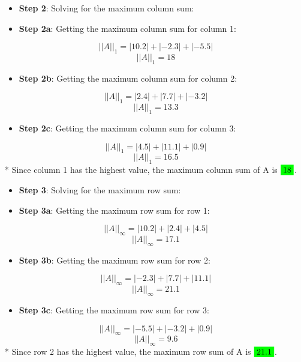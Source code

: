 \documentclass[
]{article}
\providecommand{\tightlist}{%
  \setlength{\itemsep}{0pt}\setlength{\parskip}{0pt}}
\begin{document}
\begin{itemize}
\item
  \textbf{Step 2}: Solving for the maximum column sum:
\item
  \textbf{Step 2a}: Getting the maximum column sum for column 1:
\end{itemize}

\[
    ||A||_{1}= |10.2| + |-2.3| + |-5.5|
  \] \[
    ||A||_{1}= 18
  \]

\begin{itemize}
\tightlist
\item
  \textbf{Step 2b}: Getting the maximum column sum for column 2:
\end{itemize}

\[
    ||A||_{1}= |2.4| + |7.7| + |-3.2|
  \] \[
    ||A||_{1}= 13.3
  \]

\begin{itemize}
\tightlist
\item
  \textbf{Step 2c}: Getting the maximum column sum for column 3:
\end{itemize}

\[
    ||A||_{1}= |4.5| + |11.1| + |0.9|
  \] \[
    ||A||_{1}= 16.5
  \] * Since column 1 has the highest value, the maximum column sum of A
is \(\colorbox{green}{18}\).

\begin{itemize}
\item
  \textbf{Step 3}: Solving for the maximum row sum:
\item
  \textbf{Step 3a}: Getting the maximum row sum for row 1:
\end{itemize}

\[
    ||A||_{\infty}= |10.2| + |2.4| + |4.5|
  \] \[
    ||A||_{\infty}= 17.1
  \]

\begin{itemize}
\tightlist
\item
  \textbf{Step 3b}: Getting the maximum row sum for row 2:
\end{itemize}

\[
    ||A||_{\infty}= |-2.3| + |7.7| + |11.1|
  \] \[
    ||A||_{\infty}= 21.1
  \]

\begin{itemize}
\tightlist
\item
  \textbf{Step 3c}: Getting the maximum row sum for row 3:
\end{itemize}

\[
    ||A||_{\infty}= |-5.5| + |-3.2| + |0.9|
  \] \[
    ||A||_{\infty}= 9.6
  \] * Since row 2 has the highest value, the maximum row sum of A is
\(\colorbox{green}{21.1}\).
\end{document}
